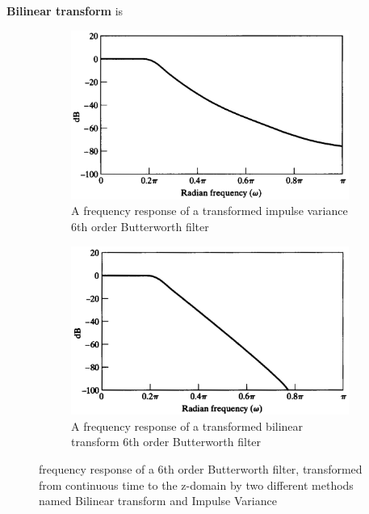 \textbf{Bilinear transform} is 

\begin{figure}[H]
	\setcounter{subfigure}{0}
	\centering
	\begin{subfigure}{.45\textwidth}
		\centering
		\includegraphics[width=\linewidth]{figures/BilinearFrequencyResponse.pdf}
		\caption{A frequency response of a transformed impulse variance 6th order Butterworth filter}
		\label{fig:ImpulseVarianceResponse}
	\end{subfigure}
	\hfill
	\begin{subfigure}{.45\textwidth}
		\centering
		\includegraphics[width=\linewidth]{figures/ImpulseVariantFrequencyResponse.pdf}
		\caption{A frequency response of a transformed bilinear transform 6th order Butterworth filter}
		\label{fig:BilinearTransformResponse}
	\end{subfigure}
	\caption{frequency response of a 6th order Butterworth filter, transformed from continuous time to the z-domain by two different methods named Bilinear transform and Impulse Variance}
		\label{fig:bilinearandimpulsevariance}
\end{figure}

